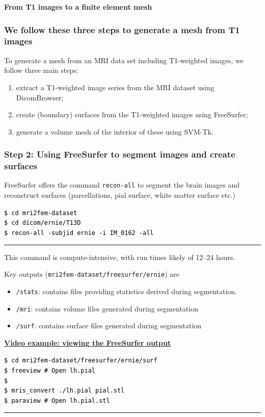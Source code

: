 \documentclass[mathserif, aspectratio=169]{beamer}
\newcommand{\mysection}[1]{\begin{frame} \begin{center} \vspace{3em} \textbf{#1} \end{center} \end{frame}}
\newcommand{\videosection}[3]{\begin{frame} \begin{center} \vspace{3em} \href{#2}{\textcolor{rognesred}{\textbf{#1}}} \end{center} #3 \end{frame}}
\def\formtmpX#1#2{{\vskip3pt\noindent\fboxsep=0pt{\parbox{\textwidth}{\hbox to \textwidth{\hskip3pt\vbox{\raggedright\noindent\textbf{#2\vphantom{Qy}}}\hfill}}}\vskip3pt\par
\noindent\kern0pt}}
\newenvironment{programcode}[1]{\ignorespaces\def\stmtopen##1{##1}%
\formtmpX{programcode}{\centerline{\small{#1}}}}{\noindent\textcolor{programcode}{\rule{\columnwidth}{0pt}}\par\addvspace{\baselineskip}}%
\newcommand{\terminal}[1]{
  \vspace{-1em}
  \begin{programcode}{}%
    \colorbox{blue!10}{\parbox{0.98\textwidth}{\textcolor{black}{\texttt{#1}}}}
  \end{programcode}
  \vspace{-0.5em}
}
\newcommand{\emp}[1]{\texttt{#1}}
\begin{document}
\mysection{From T1 images to a finite element mesh}

\begin{frame}
\frametitle{We follow these three steps to generate a mesh from T1 images}

To generate a mesh from an MRI data set including T1-weighted images,
we follow three main steps:
\bigskip
\begin{enumerate}
\item
  extract a T1-weighted image series from the MRI dataset using DicomBrowser;
\item
  create (boundary) surfaces from the T1-weighted images using FreeSurfer;
\item 
  generate a volume mesh of the interior of these using SVM-Tk.
\end{enumerate}
\end{frame}

\begin{frame}
\frametitle{Step 2: Using FreeSurfer to segment images and create surfaces}

FreeSurfer offers the command \emp{recon-all} to segment the brain
images and reconstruct surfaces (parcellations, pial surface, white
matter surface etc.)

\terminal{\$ cd mri2fem-dataset \\
\$ cd dicom/ernie/T13D \\
\$ recon-all -subjid ernie -i IM\_0162 -all}

This command is compute-intensive, with run times likely of 12--24
hours.

Key outputs (\emp{mri2fem-dataset/freesurfer/ernie}) are 
\begin{itemize}
\item \emp{/stats}: contains files providing statistics derived during segmentation.
\item \emp{/mri}: contains volume files generated during segmentation
\item \emp{/surf}: contains surface files generated during segmentation
\end{itemize}
\end{frame}

\videosection{Video example: viewing the FreeSurfer output}{https://youtu.be/Svz3kYfsCQo}
{\terminal{\$ cd mri2fem-dataset/freesurfer/ernie/surf \\
\$ freeview \# Open lh.pial \\
\$ \\
\$ mris\_convert ./lh.pial pial.stl \\
\$ paraview \# Open lh.pial.stl}
}
\end{document}
